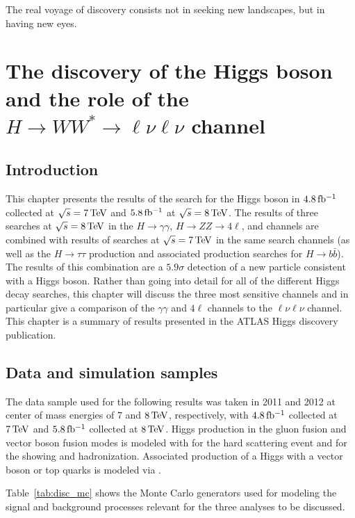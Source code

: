 \begin{savequote}[75mm]
The real voyage of discovery consists not in seeking new landscapes, but in having new eyes.
\end{savequote}

\chapter{The discovery of the Higgs boson and the role of the $H\rightarrow WW^{*}\rightarrow \ell\nu\ell\nu$ channel}

\section{Introduction}

This chapter presents the results of the search for the Higgs boson in $4.8 \mbox{\,fb$^{-1}$}$ collected at $\sqrt{s} = 7 \TeV$ and $5.8 \mbox{\,fb$^{-1}$}$ at $\sqrt{s} = 8 \TeV$. The results of three searches at $\sqrt{s} = 8 \TeV$ in the $H\to \gamma \gamma$, $H\to ZZ \to 4\ell$, and \HWWfull channels are combined with results of searches at $\sqrt{s} = 7 \TeV$ in the same search channels (as well as the $H\to\tau\tau$ production and associated production searches for $H\to b\bar{b}$). The results of this combination are a $5.9 \sigma$ detection of a new particle consistent with a Higgs boson. Rather than going into detail for all of the different Higgs decay searches, this chapter will discuss the three most sensitive channels and in particular give a comparison of the $\gamma\gamma$ and $4\ell$ channels to the $\ell\nu\ell\nu$ channel. This chapter is a summary of results presented in the ATLAS Higgs discovery publication\cite{Discovery}.


\section{Data and simulation samples}

The data sample used for the following results was taken in 2011 and 2012 at center of mass energies of $7$ and $8 \TeV$, respectively, with $4.8 \mbox{\,fb$^{-1}$}$ collected at $7 \TeV$ and $5.8 \mbox{\,fb$^{-1}$}$ collected at $8 \TeV$. Higgs production in the gluon fusion and vector boson fusion modes is modeled with \POWHEG for the hard scattering event and \PYTHIA for the showing and hadronization. Associated production of a Higgs with a vector boson or top quarks is modeled via \PYTHIA. 

Table~\ref{tab:disc_mc} shows the Monte Carlo generators used for modeling the signal and background processes relevant for the three analyses to be discussed. 

